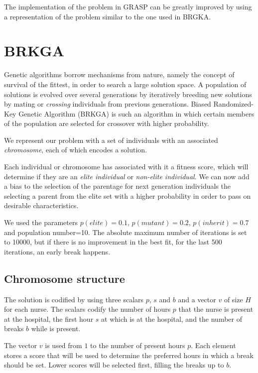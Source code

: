 \documentclass[12pt,a4paper]{article}
\begin{document}
The implementation of the problem in GRASP can be greatly improved by using a 
representation of the problem similar to the one used in BRGKA.

\section{BRKGA}
%
Genetic algorithms borrow mechanisms from nature, namely the concept of survival 
of the fittest, in order to search a large solution space. A population of 
solutions is evolved over several generations by iteratively breeding new 
solutions by mating or \textit{crossing} individuals from previous generations.  
Biased Randomized-Key Genetic Algorithm (BRKGA) is such an algorithm in which 
certain members of the population are selected for crossover with higher 
probability.

We represent our problem with a set of individuals with an associated 
\textit{chromosome}, each of which encodes a solution.

Each individual or chromosome has associated with it a fitness score, which will 
determine if they are an \textit{elite individual} or \textit{non-elite 
individual}. We can now add a bias to the selection of the parentage for next 
generation individuals the selecting a parent from the elite set with a higher 
probability in order to pass on desirable characteristics.

We used the parameters $p(elite) = 0.1$, $p(mutant) = 0.2$, $p(inherit) = 0.7$ 
and population number=10. The absolute maximum number of iterations is set to 
10000, but if there is no improvement in the best fit, for the last 500 
iterations, an early break happens.

\subsection{Chromosome structure}

The solution is codified by using three scalars $p$, $s$ and $b$ and a vector 
$v$ of size $H$ for each nurse. The scalars codify the number of hours $p$ that 
the nurse is present at the hospital, the first hour $s$ at which is at the 
hospital, and the number of breaks $b$ while is present.

The vector $v$ is used from $1$ to the number of present hours $p$. Each element 
stores a score that will be used to determine the preferred hours in which a 
break should be set. Lower scores will be selected first, filling the breaks up 
to $b$.
\end{document}
